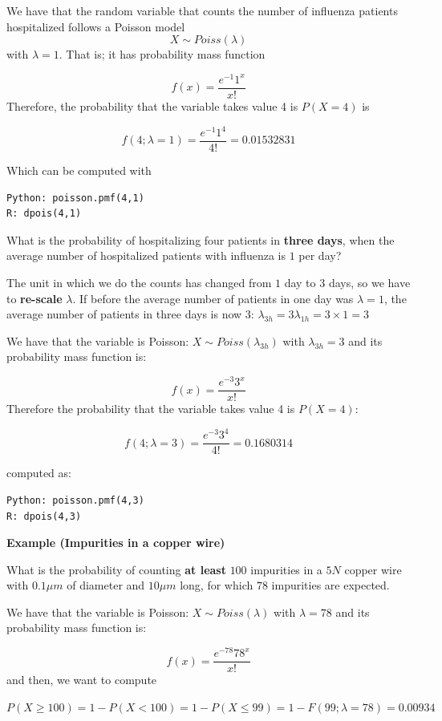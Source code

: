 \documentclass[
]{book}
\begin{document}
We have that the random variable that counts the number of influenza patients hospitalized follows a Poisson model \[X \sim Poiss(\lambda)\] with \(\lambda=1\). That is; it has probability mass function

\[f(x)= \frac{e^{-1}1^x}{x!}\]
Therefore, the probability that the variable takes value 4 is \(P(X=4)\) is

\[f(4; \lambda=1)= \frac{e^{-1}1^4}{4!}=0.01532831\]

Which can be computed with

\begin{verbatim}
Python: poisson.pmf(4,1)
R: dpois(4,1)
\end{verbatim}

What is the probability of hospitalizing four patients in \textbf{three days}, when the average number of hospitalized patients with influenza is \(1\) per day?

The unit in which we do the counts has changed from \(1\) day to \(3\) days, so we have to \textbf{re-scale} \(\lambda\). If before the average number of patients in one day was \(\lambda=1\), the average number of patients in three days is now 3: \(\lambda_{3h}=3\lambda_{1h}=3\times 1=3\)

We have that the variable is Poisson: \(X \sim Poiss(\lambda_{3h})\) with \(\lambda_{3h}=3\) and its probability mass function is:

\[f(x)= \frac{e^{-3}3^x}{x!}\]
Therefore the probability that the variable takes value 4 is \(P(X=4)\):

\[f(4; \lambda=3)= \frac{e^{-3}3^4}{4!}=0.1680314\]

computed as:

\begin{verbatim}
Python: poisson.pmf(4,3)
R: dpois(4,3)
\end{verbatim}

\textbf{Example (Impurities in a copper wire)}

What is the probability of counting \textbf{at least} \(100\) impurities in a \(5N\) copper wire with \(0.1\mu m\) of diameter and \(10\mu m\) long, for which \(78\) impurities are expected.

We have that the variable is Poisson: \(X \sim Poiss(\lambda)\) with \(\lambda=78\) and its probability mass function is:

\[f(x)= \frac{e^{-78}78^x}{x!}\]
and then, we want to compute

\(P(X\geq 100)=1-P(X < 100)=1-P(X \leq 99)=1-F(99; \lambda=78)=0.00934\)
\end{document}
